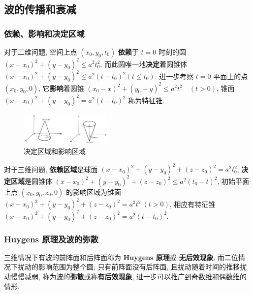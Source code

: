 \documentclass[10pt]{yerbaformat}
\begin{document}
\subsection{波的传播和衰减}

\subsubsection{依赖、影响和决定区域}
\par 对于二维问题, 空间上点 $\left(x_{0}, y_{0}, t_{0}\right)$ \textbf{依赖}于 $t=0$ 时刻的圆 $\left(x-x_{0}\right)^{2}+\left(y-y_{0}\right)^{2} \leqslant a^{2} t_{0}^{2}$, 而此圆唯一地\textbf{决定}着圆锥体 $\left(x-x_{0}\right)^{2}+\left(y-y_{0}\right)^{2} \leqslant a^{2}\left(t-t_{0}\right)^{2} \left(t \leqslant t_{0}\right)$. 进一步考察 $t=0$ 平面上的点 $\left(x_{0}, y_{0}, 0\right)$, 它\textbf{影响}着圆锥 $\left(x_{0}-x\right)^{2}+\left(y_{0}-y\right)^{2} \leqslant a^{2} t^{2} \quad(t>0)$, 锥面 $\left(x-x_{0}\right)^{2}+\left(y-y_{0}\right)^{2}=a^{2}\left(t-t_{0}\right)^{2}$ 称为特征锥.

\begin{figure}[htbp]
    \centering
    \includegraphics[width=0.4\textwidth]{figure/domain.jpg}
    \caption{决定区域和影响区域 \label{fig:scatter}}
\end{figure}

\par 对于三维问题, \textbf{依赖区域}是球面 $\left(x-x_{0}\right)^{2}+\left(y-y_{0}\right)^{2}+\left(z-z_{0}\right)^{2}=a^{2} t_{0}^{2}$, \textbf{决定区域}是圆锥体 $\left(x-x_{0}\right)^{2}+\left(y-y_{0}\right)^{2}+\left(z-z_{0}\right)^{2} \leqslant a^{2}\left(t_{0}-t\right)^{2}$, 初始平面上点 $\left(x_{0}, y_{0}, z_{0}, 0\right)$ 的影响区域为锥面 $\left(x-x_{0}\right)^{2}+\left(y-y_{0}\right)^{2}+\left(z-z_{0}\right)^{2}=a^{2} t^{2} \ (t>0)$, 相应有特征锥 $\left(x-x_{0}\right)^{2}+\left(y-y_{0}\right)^{2}+\left(z-z_{0}\right)^{2}=a^{2}\left(t-t_{0}\right)^{2}$.

\subsubsection{Huygens 原理及波的弥散}

\par 三维情况下有波的前阵面和后阵面称为 \textbf{Huygens 原理}或 \textbf{无后效现象}, 而二位情况下扰动的影响范围为整个圆, 只有前阵面没有后阵面, 且扰动随着时间的推移扰动慢慢减弱, 称为波的\textbf{弥散}或称\textbf{有后效现象}, 进一步可以推广到奇数维和偶数维的情形.
\end{document}
